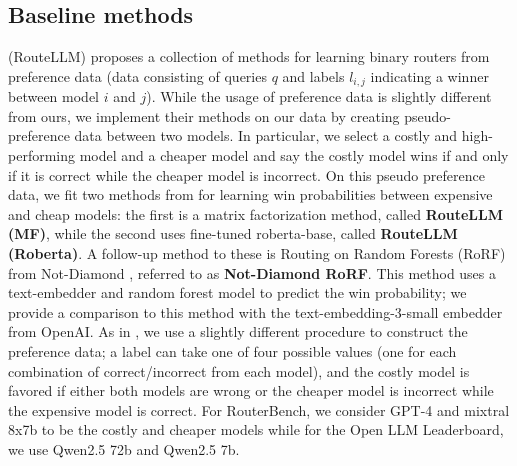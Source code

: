 \subsection{Baseline methods}
\citet{ong2024routellmlearningroutellms} (RouteLLM) proposes a collection of methods for learning binary routers from preference data (data consisting of queries $q$ and labels $l_{i,j}$ indicating a winner between model $i$ and $j$). While the usage of preference data is slightly different from ours, we implement their methods on our data by creating pseudo-preference data between two models. In particular, we select a costly and high-performing model and a cheaper model and say the costly model wins if and only if it is correct while the cheaper model is incorrect. On this pseudo preference data, we fit two methods from \citet{ong2024routellmlearningroutellms} for learning win probabilities between expensive and cheap models: the first is a matrix factorization method, called {\bf RouteLLM (MF)}, while the second uses fine-tuned {roberta-base}, called {\bf RouteLLM (Roberta)}. A follow-up method to these is Routing on Random Forests (RoRF) from Not-Diamond \citep{notdiamond2023rorf}, referred to as {\bf Not-Diamond RoRF}. This method uses a text-embedder and random forest model to predict the win probability; we provide a comparison to this method with the {text-embedding-3-small} embedder from OpenAI. As in \citet{notdiamond2023rorf}, we use a slightly different procedure to construct the preference data; a label can take one of four possible values (one for each combination of correct/incorrect from each model), and the costly model is favored if either both models are wrong or the cheaper model is incorrect while the expensive model is correct. For RouterBench, we consider GPT-4 and mixtral 8x7b to be the costly and cheaper models while for the Open LLM Leaderboard, we use Qwen2.5 72b and Qwen2.5 7b.

